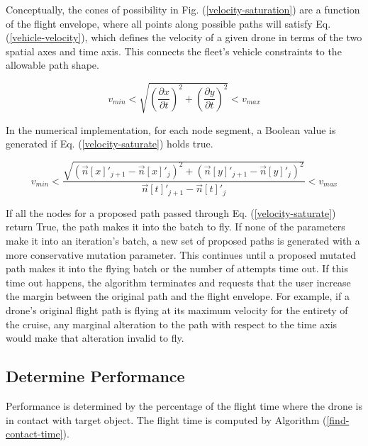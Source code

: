 \documentclass[conf]{new-aiaa}
\begin{document}
Conceptually, the cones of possibility in Fig. (\ref{velocity-saturation}) are a function of the flight envelope, where all points along possible paths will satisfy Eq. (\ref{vehicle-velocity}), which defines the velocity of a given drone in terms of the two spatial axes and time axis. This connects the fleet's vehicle constraints to the allowable path shape.

\begin{equation}
\label{vehicle-velocity}
v_{min} < \sqrt{\left(\frac{\partial{x}}{\partial{t}}\right)^2 + \left(\frac{\partial{y}}{\partial{t}}\right)^2} < v_{max}
\end{equation}

In the numerical implementation, for each node segment, a Boolean value is generated if Eq. (\ref{velocity-saturate}) holds true.

\begin{equation}
\label{velocity-saturate}
v_{min} < \frac{\sqrt{\left(\vec{n}[x]'_{j + 1} - \vec{n}[x]'_{j}\right)^2 + \left(\vec{n}[y]'_{j + 1} - \vec{n}[y]'_{j}\right)^2}}{\vec{n}[t]'_{j + 1} - \vec{n}[t]'_{j}} < v_{max}
\end{equation}

If all the nodes for a proposed path passed through Eq. (\ref{velocity-saturate}) return True, the path makes it into the batch to fly. If none of the parameters make it into an iteration's batch, a new set of proposed paths is generated with a more conservative mutation parameter. This continues until a proposed mutated path makes it into the flying batch or the number of attempts time out. If this time out happens, the algorithm terminates and requests that the user increase the margin between the original path and the flight envelope. For example, if a drone's original flight path is flying at its maximum velocity for the entirety of the cruise, any marginal alteration to the path with respect to the time axis would make that alteration invalid to fly.

\subsection{Determine Performance}
Performance is determined by the percentage of the flight time where the drone is in contact with target object. The flight time is computed by Algorithm (\ref{find-contact-time}).
\end{document}
